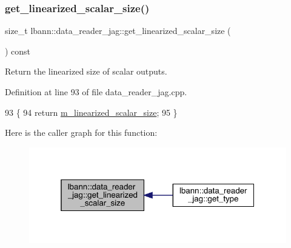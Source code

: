 \mbox{\label{classlbann_1_1data__reader__jag_ab1060bef9fe9cbc46f36c90c1ebfd149}} 
\subsubsection{\texorpdfstring{get\+\_\+linearized\+\_\+scalar\+\_\+size()}{get\_linearized\_scalar\_size()}}
{\footnotesize\ttfamily size\+\_\+t lbann\+::data\+\_\+reader\+\_\+jag\+::get\+\_\+linearized\+\_\+scalar\+\_\+size (\begin{DoxyParamCaption}{ }\end{DoxyParamCaption}) const}



Return the linearized size of scalar outputs. 



Definition at line 93 of file data\+\_\+reader\+\_\+jag.\+cpp.


\begin{DoxyCode}
93                                                          \{
94   \textcolor{keywordflow}{return} \hyperlink{classlbann_1_1data__reader__jag_a856b4b9cdf9d8569e5fef1d5d996870d}{m\_linearized\_scalar\_size};
95 \}
\end{DoxyCode}
Here is the caller graph for this function\+:\nopagebreak
\begin{figure}[H]
\begin{center}
\leavevmode
\includegraphics[width=319pt]{classlbann_1_1data__reader__jag_ab1060bef9fe9cbc46f36c90c1ebfd149_icgraph}
\end{center}
\end{figure}
\mbox{\label{classlbann_1_1data__reader__jag_a321580d6f335308e19868b4c3d5c9558}} 
